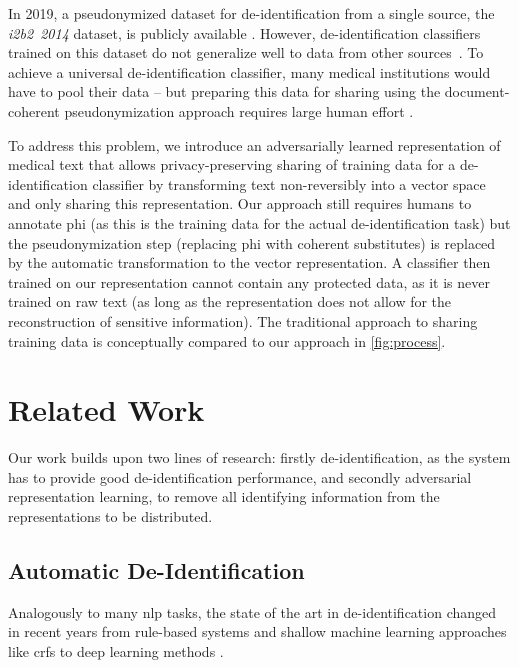 %
In 2019, a pseudonymized dataset for de-identification from a single source, the \emph{i2b2~2014} dataset, is publicly available \citep{stubbs2015annotating}.
%
However, de-identification classifiers trained on this dataset do not generalize well to data from other sources~\citep{stubbs2017identification}.
%
To achieve a universal de-identification classifier, many medical institutions would have to pool their data -- but
preparing this data for sharing using the document-coherent pseudonymization approach requires large human effort \citep{dernoncourt2017identification}.

%
To address this problem, we introduce an adversarially learned representation of medical text that allows privacy-preserving sharing of training data for a de-identification classifier by transforming text non-reversibly into a vector space and only sharing this representation.
%
Our approach still requires humans to annotate \ac{phi} (as this is the training data for the actual de-identification task) but the pseudonymization step (replacing \ac{phi} with coherent substitutes) is replaced by the automatic transformation to the vector representation.
%
A classifier then trained on our representation cannot contain any protected data, as it is never trained on raw text (as long as the representation does not allow for the reconstruction of sensitive information).
%
The traditional approach to sharing training data is conceptually compared to our approach in \cref{fig:process}.

\section{Related Work}\label{sec:related}
%
Our work builds upon two lines of research: firstly de-identification, as the system has to provide good de-identification performance, and secondly adversarial representation learning, to remove all identifying information from the representations to be distributed.

\subsection{Automatic De-Identification}
%
Analogously to many \ac{nlp} tasks, the state of the art in de-identification changed in recent years from rule-based systems and shallow machine learning approaches like \acp{crf} \citep{uzuner2007evaluating,meystre2010automatic} to deep learning methods \citep{stubbs2017identification, dernoncourt2017identification, liu2017identification}.

